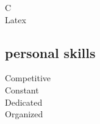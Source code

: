 \documentclass[]{friggeri-cv} %
\begin{document}
\begin{minipage}[t]{0.5\linewidth}
\begin{flushright}
 C\quad{\color{red} $\varheartsuit\varheartsuit\varheartsuit\varheartsuit\varheartsuit\varheartsuit\varheartsuit\varheartsuit$}{\color{black} $\varheartsuit\varheartsuit\varheartsuit\varheartsuit\varheartsuit\varheartsuit\varheartsuit$} \\

 Latex\quad{\color{red} $\varheartsuit\varheartsuit\varheartsuit\varheartsuit\varheartsuit\varheartsuit\varheartsuit\varheartsuit\varheartsuit\varheartsuit\varheartsuit$}{\color{black} $\varheartsuit\varheartsuit\varheartsuit\varheartsuit$}

 \end{flushright}

    \end{minipage}%
    \begin{minipage}[t]{0.5\linewidth}

    \begin{flushright}
    \section{personal skills}
    \end{flushright}

\hfill
\begin{flushright}

Competitive\quad{\color{blue} $\varheartsuit\varheartsuit\varheartsuit\varheartsuit\varheartsuit\varheartsuit\varheartsuit\varheartsuit\varheartsuit\varheartsuit\varheartsuit\varheartsuit\varheartsuit\varheartsuit$}{\color{black} $\varheartsuit$} \\

Constant\quad{\color{blue} $\varheartsuit\varheartsuit\varheartsuit\varheartsuit\varheartsuit\varheartsuit\varheartsuit\varheartsuit\varheartsuit\varheartsuit$}{\color{black} $\varheartsuit\varheartsuit\varheartsuit\varheartsuit\varheartsuit$} \\

Dedicated\quad{\color{blue} $\varheartsuit\varheartsuit\varheartsuit\varheartsuit\varheartsuit\varheartsuit\varheartsuit\varheartsuit\varheartsuit\varheartsuit\varheartsuit\varheartsuit\varheartsuit$}{\color{black} $\varheartsuit\varheartsuit$} \\

 Organized\quad{\color{blue} $\varheartsuit\varheartsuit\varheartsuit\varheartsuit\varheartsuit\varheartsuit\varheartsuit\varheartsuit\varheartsuit\varheartsuit\varheartsuit\varheartsuit$}{\color{black} $\varheartsuit\varheartsuit\varheartsuit$} \\


\end{flushright}
\end{minipage}
\end{document}

